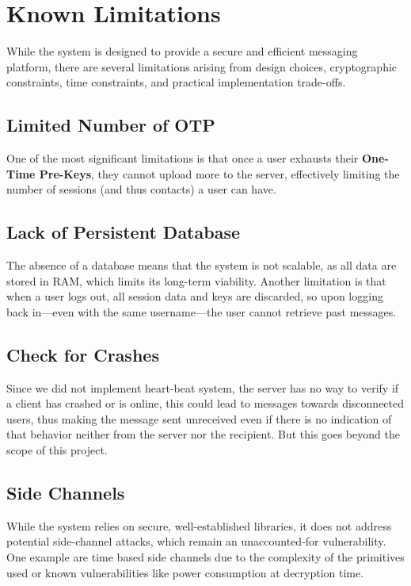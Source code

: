 \chapter{Known Limitations}
\label{cha:Limitations}

While the system is designed to provide a secure and efficient messaging platform, there are several limitations arising from design choices, cryptographic constraints, time constraints, and practical implementation trade-offs. 

\section{Limited Number of OTP}
\label{sec:LimitedNumberofOTP}

One of the most significant limitations is that once a user exhausts their \textbf{One-Time Pre-Keys}, they cannot upload more to the server, effectively limiting the number of sessions (and thus contacts) a user can have. 

\section{Lack of Persistent Database}
\label{sec:LackofServer}

The absence of a database means that the system is not scalable, as all data are stored in RAM, which limits its long-term viability. Another limitation is that when a user logs out, all session data and keys are discarded, so upon logging back in—even with the same username—the user cannot retrieve past messages.

\section{Check for Crashes}
\label{sec:CheckforCrashes}

Since we did not implement heart-beat system, the server has no way to verify if a client has crashed or is online, this could lead to messages towards disconnected users, thus making the message sent unreceived even if there is no indication of that behavior neither from the server nor the recipient. But this goes beyond the scope of this project.

\section{Side Channels}
\label{sec:SideChannels}

While the system relies on secure, well-established libraries, it does not address potential side-channel attacks, which remain an unaccounted-for vulnerability. One example are time based side channels due to the complexity of the primitives used or known vulnerabilities like power consumption at decryption time.


